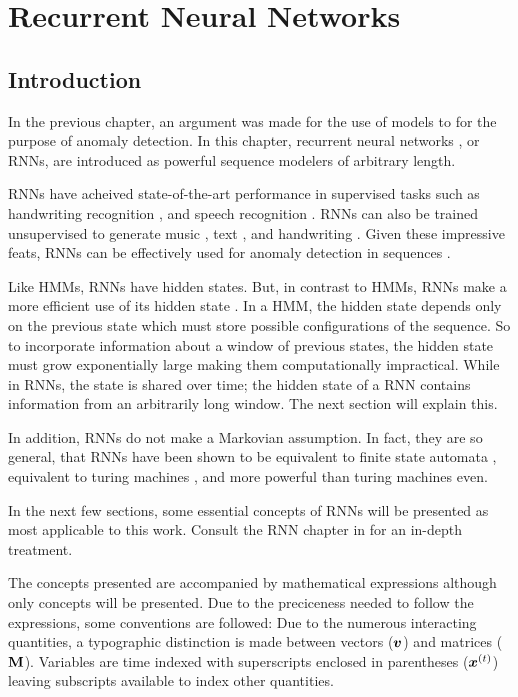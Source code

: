 
\chapter[]{Recurrent Neural Networks}
\label{ch:rnn}

\section{Introduction}

In the previous chapter, an argument was made for the use of models to for the purpose of anomaly detection. In this chapter, recurrent neural networks \cite{Rumelhart1986}, or RNNs, are introduced as powerful sequence modelers of arbitrary length.

RNNs have acheived state-of-the-art performance in supervised tasks such as handwriting recognition \cite{Graves2009}, and speech recognition  \cite{Graves2013}. RNNs can also be trained unsupervised to generate  music  \cite{Boulanger-Lewandowski2012}, text \cite{Martens2011a,Graves2013b}, and handwriting \cite{Graves2013b}. Given these impressive feats, RNNs can be effectively used for anomaly detection in sequences \cite{Marchi2015,Malhotra2015}.

Like HMMs, RNNs have hidden states. But, in contrast to HMMs, RNNs make a more efficient use of its hidden state \cite{ZacharyC.Lipton2015}. In a HMM, the hidden state depends only on the previous state which must store possible configurations of the sequence. So to incorporate information about a window of previous states, the hidden state must grow exponentially large making them computationally impractical. While in RNNs, the state is shared over time; the hidden state of a RNN contains information from an arbitrarily long window. The next section will explain this.

In addition, RNNs do not make a Markovian assumption. In fact, they are so general, that RNNs have been shown to be equivalent to finite state automata \cite{Minsky1967}, equivalent to turing machines \cite{Siegelmann1995}, and more powerful than turing machines \cite{Siegelmann1993} even.

In the next few sections, some essential concepts of RNNs will be presented as most applicable to this work. Consult the RNN chapter in \cite{Bengio-et-al-2015-Book} for an in-depth treatment.

The concepts presented are accompanied by mathematical expressions although only concepts will be presented. Due to the preciceness needed to follow the expressions, some conventions are followed: Due to the numerous interacting quantities, a typographic distinction is made between vectors ($\boldsymbol{v}$) and  matrices ($\mathbf{M}$). Variables are time indexed with superscripts enclosed in parentheses ($\boldsymbol{x}^{(t)}$) leaving subscripts available to index other quantities.

